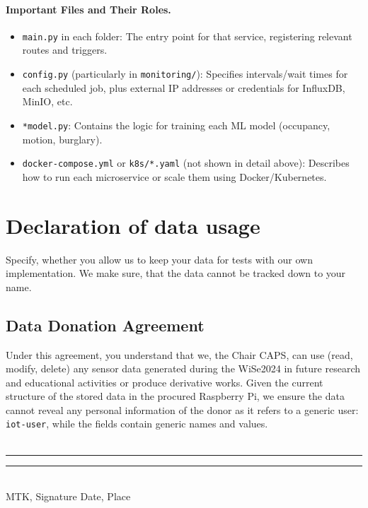 \documentclass[A4,10pt]{article}
\begin{document}
\paragraph{Important Files and Their Roles.}
\begin{itemize}
    \item \texttt{main.py} in each folder: The entry point for that service, registering 
          relevant routes and triggers.
    \item \texttt{config.py} (particularly in \texttt{monitoring/}): 
          Specifies intervals/wait times for each scheduled job, plus 
          external IP addresses or credentials for InfluxDB, MinIO, etc.
    \item \texttt{*model.py}: Contains the logic for training each ML model 
          (occupancy, motion, burglary).
    \item \texttt{docker-compose.yml} or \texttt{k8s/*.yaml} (not shown in detail above): 
          Describes how to run each microservice or scale them using Docker/Kubernetes.
\end{itemize}


\section{Declaration of data usage}

Specify, whether you allow us to keep your data for tests with our own implementation. We make sure, that the data cannot be tracked down to your name. 

\subsection{Data Donation Agreement}
Under this agreement, you understand that we, the Chair CAPS, can use (read, modify, delete) any sensor data generated during the WiSe2024 in future research and educational activities or produce derivative works. Given the current structure of the stored data in the procured Raspberry Pi, we ensure the data cannot reveal any personal information of the donor as it refers to a generic user: \texttt{iot-user}, while the fields contain generic names and values.
\bigskip
\\
\\

\noindent\rule{5cm}{0.4pt} \hfill \noindent\rule{5cm}{0.4pt}\\
MTK, Signature \hfill Date, Place

\pagebreak

\nocite{robotron,
stonx,vice,650sim,herculessim,zib,4004,thermal1,thermal2,rojas}




\end{document}
